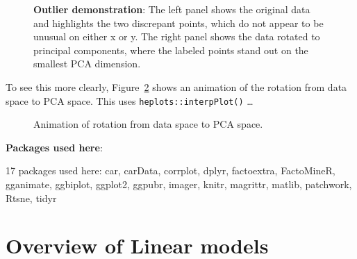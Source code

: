 \documentclass[
  letterpaper,
  10pt,
  krantz2]{krantz}
\begin{document}
\begin{figure}


\caption{\label{fig-outlier-demo}\textbf{Outlier demonstration}: The
left panel shows the original data and highlights the two discrepant
points, which do not appear to be unusual on either x or y. The right
panel shows the data rotated to principal components, where the labeled
points stand out on the smallest PCA dimension.}

\end{figure}%

To see this more clearly, Figure~\ref{fig-outlier-animation} shows an
animation of the rotation from data space to PCA space. This uses
\texttt{heplots::interpPlot()} \ldots{}

\begin{figure}

\centering{

}

\caption{\label{fig-outlier-animation}Animation of rotation from data
space to PCA space.}

\end{figure}%

\textbf{Packages used here}:

17 packages used here: car, carData, corrplot, dplyr, factoextra,
FactoMineR, gganimate, ggbiplot, ggplot2, ggpubr, imager, knitr,
magrittr, matlib, patchwork, Rtsne, tidyr


\chapter{Overview of Linear models}\label{sec-linear-models}
\end{document}
